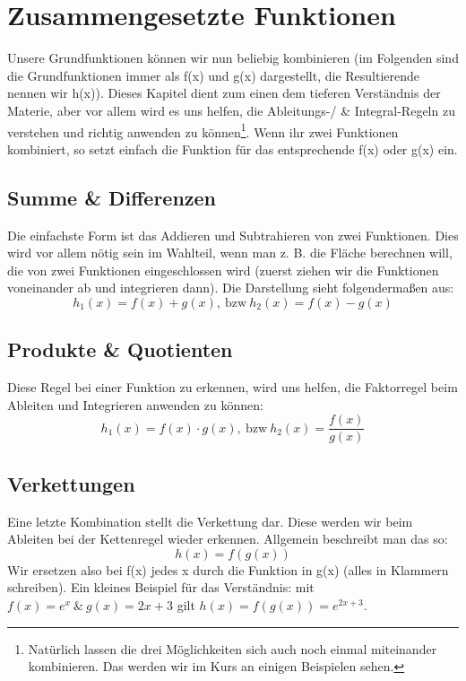 \section{Zusammengesetzte Funktionen}
Unsere Grundfunktionen können wir nun beliebig kombinieren (im Folgenden sind die Grundfunktionen immer als f(x) und g(x) dargestellt, die Resultierende nennen wir h(x)). Dieses Kapitel dient zum einen dem tieferen Verständnis der Materie, aber vor allem wird es uns helfen, die Ableitungs-/ \& Integral-Regeln zu verstehen und richtig anwenden zu können\footnote{Natürlich lassen die drei Möglichkeiten sich auch noch einmal miteinander kombinieren. Das werden wir im Kurs an einigen Beispielen sehen.}. Wenn ihr zwei Funktionen kombiniert, so setzt einfach die Funktion für das entsprechende f(x) oder g(x) ein.
\subsection{Summe \& Differenzen}
Die einfachste Form ist das Addieren und Subtrahieren von zwei Funktionen. Dies wird vor allem nötig sein im Wahlteil, wenn man z. B. die Fläche berechnen will, die von zwei Funktionen eingeschlossen wird (zuerst ziehen wir die Funktionen voneinander ab und integrieren dann). Die Darstellung sieht folgendermaßen aus:
\[h_1(x)=f(x)+g(x), \mathrm{\ bzw\ } h_2(x)=f(x)-g(x)\]
\subsection{Produkte \& Quotienten}
Diese Regel bei einer Funktion zu erkennen, wird uns helfen, die Faktorregel beim Ableiten und Integrieren anwenden zu können:
\[h_1(x)=f(x)\cdot g(x), \mathrm{\ bzw\ } h_2(x)=\frac{f(x)}{g(x)}\]
\subsection{Verkettungen}
Eine letzte Kombination stellt die Verkettung dar. Diese werden wir beim Ableiten bei der Kettenregel wieder erkennen. Allgemein beschreibt man das so:
\[h(x)=f(g(x))\]
Wir ersetzen also bei f(x) jedes x durch die Funktion in g(x) (alles in Klammern schreiben). Ein kleines Beispiel für das Verständnis: mit \(f(x)=e^x\ \&\ g(x)=2x+3\) gilt \(h(x)=f(g(x))=e^{2x+3}\).

